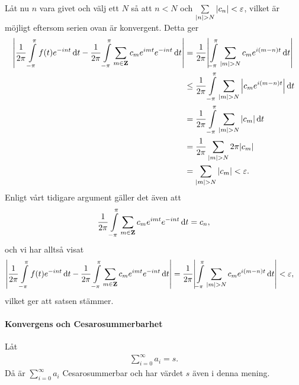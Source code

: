 Låt nu $n$ vara givet och välj ett $N$ så att $n < N$ och $\sum\limits_{\abs{n} > N}\abs{c_{n}} < \varepsilon$, vilket är möjligt eftersom serien ovan är konvergent. Detta ger
\begin{align*}
	\abs{\frac{1}{2\pi}\int\limits_{-\pi}^{\pi}f(t)e^{-int}\dd{t} - \frac{1}{2\pi}\int\limits_{-\pi}^{\pi}\sum\limits_{m\in\mathbf{Z}}c_{m}e^{imt}e^{-int}\dd{t}} &= \frac{1}{2\pi}\abs{\int\limits_{-\pi}^{\pi}\sum\limits_{\abs{m} > N}c_{m}e^{i(m - n)t}\dd{t}} \\
	                                      &\leq \frac{1}{2\pi}\int\limits_{-\pi}^{\pi}\sum\limits_{\abs{m} > N}\abs{c_{m}e^{i(m - n)t}}\dd{t} \\
	                                      &= \frac{1}{2\pi}\int\limits_{-\pi}^{\pi}\sum\limits_{\abs{m} > N}\abs{c_{m}}\dd{t} \\
	                                      &= \frac{1}{2\pi}\sum\limits_{\abs{m} > N}2\pi\abs{c_{m}} \\
	                                      &= \sum\limits_{\abs{m} > N}\abs{c_{m}} < \varepsilon.
\end{align*}
Enligt vårt tidigare argument gäller det även att
\begin{align*}
	\frac{1}{2\pi}\int\limits_{-\pi}^{\pi}\sum\limits_{m\in\mathbf{Z}}c_{m}e^{imt}e^{-int}\dd{t} = c_{n},
\end{align*}
och vi har alltså visat
\begin{align*}
	\abs{\frac{1}{2\pi}\int\limits_{-\pi}^{\pi}f(t)e^{-int}\dd{t} - \frac{1}{2\pi}\int\limits_{-\pi}^{\pi}\sum\limits_{m\in\mathbf{Z}}c_{m}e^{imt}e^{-int}\dd{t}} &= \frac{1}{2\pi}\abs{\int\limits_{-\pi}^{\pi}\sum\limits_{\abs{m} > N}c_{m}e^{i(m - n)t}\dd{t}} < \varepsilon,
\end{align*}
vilket ger att satsen stämmer.

\paragraph{Konvergens och Cesarosummerbarhet}
Låt
\begin{align*}
	\sum\limits_{i = 0}^{\infty}a_{i} = s.
\end{align*}
Då är $\sum\limits_{i = 0}^{\infty}a_{i}$ Cesarosummerbar och har värdet $s$ även i denna mening.

